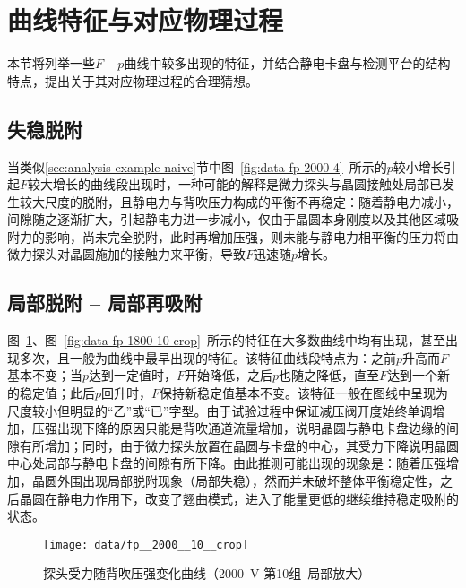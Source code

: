 \clearpage



\section{曲线特征与对应物理过程}\label{sec:analysis-feature}

本节将列举一些$F$ -- $p$曲线中较多出现的特征，并结合静电卡盘与检测平台的结构特点，提出关于其对应物理过程的合理猜想。


\subsection{失稳脱附}\label{sec:analysis-feature-destabilize}

当类似\ref{sec:analysis-example-naive}节中图~\ref{fig:data-fp-2000-4}~所示的$p$较小增长引起$F$较大增长的曲线段出现时，一种可能的解释是微力探头与晶圆接触处局部已发生较大尺度的脱附，且静电力与背吹压力构成的平衡不再稳定：随着静电力减小，间隙随之逐渐扩大，引起静电力进一步减小，仅由于晶圆本身刚度以及其他区域吸附力的影响，尚未完全脱附，此时再增加压强，则未能与静电力相平衡的压力将由微力探头对晶圆施加的接触力来平衡，导致$F$迅速随$p$增长。


\subsection{局部脱附 -- 局部再吸附}\label{sec:analysis-feature-reattach}

图~\ref{fig:data-fp-2000-10-crop}、图~\ref{fig:data-fp-1800-10-crop}~所示的特征在大多数曲线中均有出现，甚至出现多次，且一般为曲线中最早出现的特征。该特征曲线段特点为：之前$p$升高而$F$基本不变；当$p$达到一定值时，$F$开始降低，之后$p$也随之降低，直至$F$达到一个新的稳定值；此后$p$回升时，$F$保持新稳定值基本不变。该特征一般在图线中呈现为尺度较小但明显的“乙”或“已”字型。由于试验过程中保证减压阀开度始终单调增加，压强出现下降的原因只能是背吹通道流量增加，说明晶圆与静电卡盘边缘的间隙有所增加；同时，由于微力探头放置在晶圆与卡盘的中心，其受力下降说明晶圆中心处局部与静电卡盘的间隙有所下降。由此推测可能出现的现象是：随着压强增加，晶圆外围出现局部脱附现象（局部失稳），然而并未破坏整体平衡稳定性，之后晶圆在静电力作用下，改变了翘曲模式，进入了能量更低的继续维持稳定吸附的状态。

\begin{figure}[thbp]
\centering
\texttt{[image: data/fp\_\_2000\_\_10\_\_crop]}
\caption{探头受力随背吹压强变化曲线（\SI{2000}{\V} 第10组\ 局部放大）}
\label{fig:data-fp-2000-10-crop}
\end{figure}

